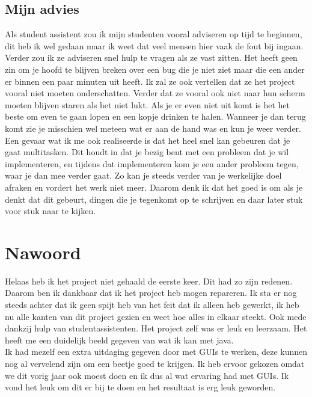 \documentclass[12pt]{article}
\begin{document}
\subsection{Mijn advies}
Als student assistent zou ik mijn studenten vooral adviseren op tijd te beginnen, dit heb ik wel gedaan maar ik weet dat veel mensen hier vaak de fout bij ingaan. Verder zou ik ze adviseren snel hulp te vragen als ze vast zitten. Het heeft geen zin om je hoofd te blijven breken over een bug die je niet ziet maar die een ander er binnen een paar minuten uit heeft. Ik zal ze ook vertellen dat ze het project vooral niet moeten onderschatten. Verder dat ze vooral ook niet naar hun scherm moeten blijven staren als het niet lukt. Als je er even niet uit komt is het het beste om even te gaan lopen en een kopje drinken te halen. Wanneer je dan terug komt zie je misschien wel meteen wat er aan de hand was en kun je weer verder.\\
Een gevaar wat ik me ook realiseerde is dat het heel snel kan gebeuren dat je gaat multitasken. Dit houdt in dat je bezig bent met een probleem dat je wil implementeren, en tijdens dat implementeren kom je een ander probleem tegen, waar je dan mee verder gaat. Zo kan je steeds verder van je werkelijke doel afraken en vordert het werk niet meer. Daarom denk ik dat het goed is om als je denkt dat dit gebeurt, dingen die je tegenkomt op te schrijven en daar later stuk voor stuk naar te kijken.
\section{Nawoord}
Helaas heb ik het project niet gehaald de eerste keer. Dit had zo zijn redenen. Daarom ben ik dankbaar dat ik het project heb mogen repareren. Ik sta er nog steeds achter dat ik geen spijt heb van het feit dat ik alleen heb gewerkt, ik heb nu alle kanten van dit project gezien en weet hoe alles in elkaar steekt. Ook mede dankzij hulp van studentassistenten. Het project zelf was er leuk en leerzaam. Het heeft me een duidelijk beeld gegeven van wat ik kan met java.\\
Ik had mezelf een extra uitdaging gegeven door met GUIs te werken, deze kunnen nog al vervelend zijn om een beetje goed te krijgen. Ik heb ervoor gekozen omdat we dit vorig jaar ook moest doen en ik dus al wat ervaring had met GUIs. Ik vond het leuk om dit er bij te doen en het resultaat is erg leuk geworden.
\end{document}

